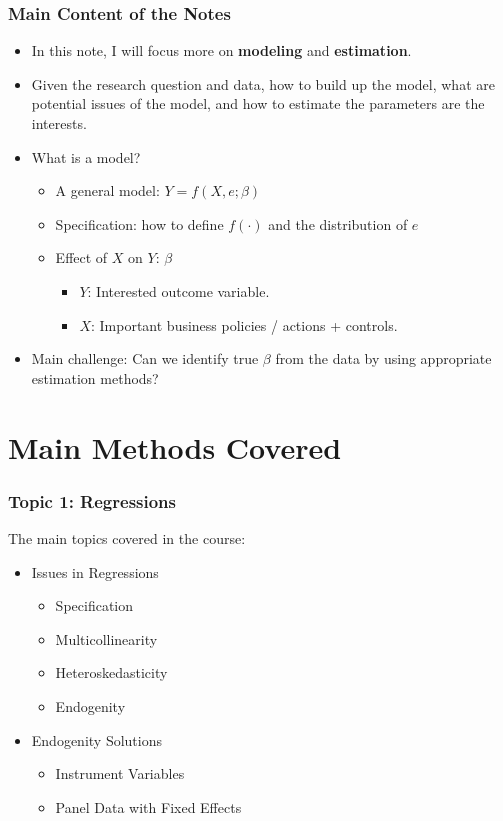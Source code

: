 \documentclass[10pt]{beamer}
\begin{document}
\begin{frame}
    \frametitle{Main Content of the Notes}
    \begin{itemize}
        \item In this note, I will focus more on \textbf{modeling} and \textbf{estimation}. 
        \item Given the research question and data, how to build up the model, what are potential issues of the model, and how to estimate the parameters are the interests.
        \item What is a model?
        \begin{itemize}
            \item A general model: $Y = f (X, e; \beta)$
            \item Specification: how to define $f(\cdot)$ and the distribution of $e$
            \item Effect of $X$ on $Y$: $\beta$
            \begin{itemize}
                \item $Y$: Interested outcome variable.
                \item $X$: Important business policies / actions + controls.
            \end{itemize}
        \end{itemize}
        \item Main challenge: Can we identify true $\beta$ from the data by using appropriate estimation methods? 
    \end{itemize}
\end{frame}


\section{Main Methods Covered}
\begin{frame}
    \frametitle{Topic 1: Regressions}
    The main topics covered in the course:
    \begin{itemize}
        \item Issues in Regressions
        \begin{itemize}
            \item Specification
            \item Multicollinearity
            \item Heteroskedasticity
            \item Endogenity
        \end{itemize}
        \item Endogenity Solutions
        \begin{itemize}
            \item Instrument Variables
            \item Panel Data with Fixed Effects
        \end{itemize}
    \end{itemize}
\end{frame}
\end{document}
